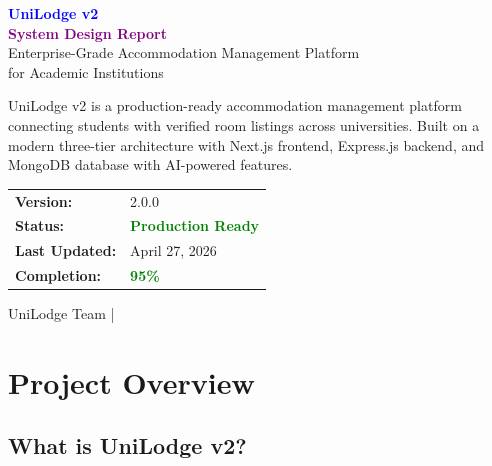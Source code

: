 \documentclass[12pt, a4paper, oneside]{report}
\begin{document}
\begin{titlepage}
\centering
\vspace*{2cm}

{\Huge \textcolor{Blue}{\textbf{UniLodge v2}}} \\[0.5cm]
{\Large \textcolor{Purple}{\textbf{System Design Report}}} \\[2cm]
{\textcolor{TextMuted}{\large Enterprise-Grade Accommodation Management Platform}} \\[0.3cm]
{\textcolor{TextMuted}{for Academic Institutions}} \\[3cm]

\begin{tcolorbox}[highlight, title=Project Overview]
UniLodge v2 is a production-ready accommodation management platform connecting students with verified room listings across universities. Built on a modern three-tier architecture with Next.js frontend, Express.js backend, and MongoDB database with AI-powered features.
\end{tcolorbox}

\vspace{2cm}

\begin{tabular}{ll}
\textcolor{TextMuted}{\textbf{Version:}} & \textcolor{TextLight}{2.0.0} \\[0.3cm]
\textcolor{TextMuted}{\textbf{Status:}} & \textcolor{Green}{\textbf{Production Ready}} \\[0.3cm]
\textcolor{TextMuted}{\textbf{Last Updated:}} & \textcolor{TextLight}{April 27, 2026} \\[0.3cm]
\textcolor{TextMuted}{\textbf{Completion:}} & \textcolor{Green}{\textbf{95\%}} \\
\end{tabular}

\vfill

\textcolor{TextMuted}{\small UniLodge Team \quad | }

\end{titlepage}

\tableofcontents
\clearpage

\chapter{Project Overview}

\section{What is UniLodge v2?}
\end{document}
